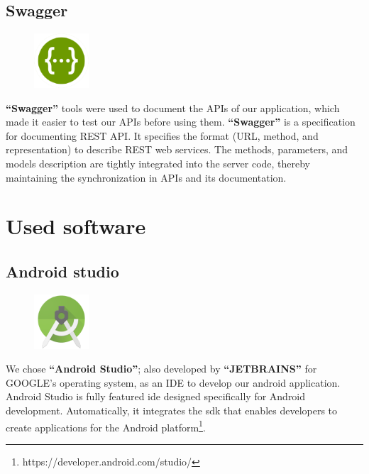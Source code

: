 \documentclass[12pt,a4paper]{report}
\begin{document}
	\subsection{Swagger}
		\begin{figure}
		\centering
		\includegraphics[width=0.8in]{Swagger-logo.png}	
		
	\end{figure}
	\textbf{``Swagger''} tools were used to document the APIs of our application, which made it easier to test our APIs before using them. \textbf{``Swagger''} is a specification for documenting REST API. It specifies the format (URL, method, and representation) to describe REST web services. The methods, parameters, and models description are tightly integrated into the server code, thereby maintaining the synchronization in APIs and its documentation.\cite{swaggerArticle}
	\section{Used software}
	\subsection{Android studio}
	\begin{figure}
		\centering
		\includegraphics[width=0.8in]{aslogo.png}	
		
	\end{figure}
	We chose \textbf{``Android Studio''}; also developed by \textbf{``JETBRAINS''} for GOOGLE's operating system, as an IDE to develop our android application. Android Studio is fully featured \ac{ide} designed specifically for Android development. Automatically, it integrates the \ac{sdk} that enables developers to create applications for the Android platform\footnote{https://developer.android.com/studio/}.\par
	\clearpage
\end{document}

